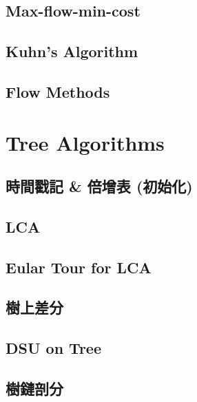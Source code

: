 \documentclass[a4paper,10pt,twocolumn,oneside]{article}
\newcommand{\inputcpp}[1]{}  %
\newcommand{\inputtxt}[1]{}                     %
\begin{document}
\subsection{Max-flow-min-cost}
\inputcpp{graph_theory/max_flow_min_cost.cpp}

\subsection{Kuhn's Algorithm}
\inputcpp{graph_theory/kuhn_algorithm.cpp}

\subsection{Flow Methods}
\inputtxt{graph_theory/flow_method.txt}


\section{Tree Algorithms}

\subsection{時間戳記 \& 倍增表 (初始化)}
\inputcpp{tree_algorithm/init.cpp}

\subsection{LCA}
\inputcpp{tree_algorithm/lca.cpp}

\subsection{Eular Tour for LCA}
\inputcpp{tree_algorithm/eular_tour_for_lca.cpp}

\subsection{樹上差分}
\inputcpp{tree_algorithm/difference.cpp}

\subsection{DSU on Tree}
\inputcpp{tree_algorithm/dsu_on_tree.cpp}

\subsection{樹鏈剖分}
\inputcpp{tree_algorithm/HLD_v2.cpp}
\end{document}
